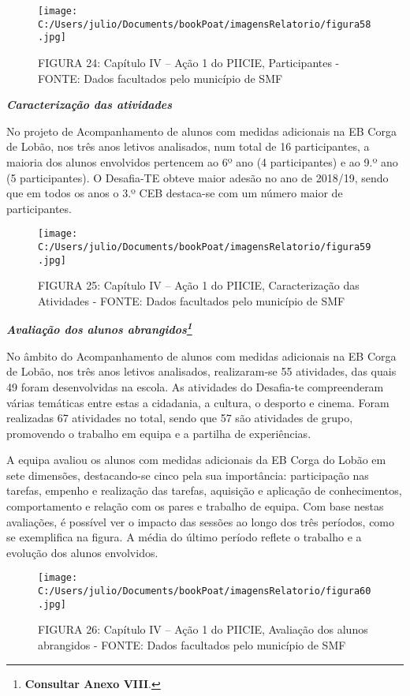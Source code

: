 \documentclass[
]{book}
\begin{document}
\begin{figure}
\centering
\texttt{[image: C:/Users/julio/Documents/bookPoat/imagensRelatorio/figura58.jpg]}
\caption{FIGURA 24: Capítulo IV -- Ação 1 do PIICIE, Participantes - FONTE: Dados facultados pelo município de SMF}
\end{figure}

\textbf{\emph{Caracterização das atividades}}

No projeto de Acompanhamento de alunos com medidas adicionais na EB Corga de Lobão, nos três anos letivos analisados, num total de 16 participantes, a maioria dos alunos envolvidos pertencem ao 6º ano (4 participantes) e ao 9.º ano (5 participantes). O Desafia-TE obteve maior adesão no ano de 2018/19, sendo que em todos os anos o 3.º CEB destaca-se com um número maior de participantes.

\begin{figure}
\centering
\texttt{[image: C:/Users/julio/Documents/bookPoat/imagensRelatorio/figura59.jpg]}
\caption{FIGURA 25: Capítulo IV -- Ação 1 do PIICIE, Caracterização das Atividades - FONTE: Dados facultados pelo município de SMF}
\end{figure}

\textbf{\emph{Avaliação dos alunos abrangidos\footnote{\textbf{Consultar Anexo VIII}.}}}

No âmbito do Acompanhamento de alunos com medidas adicionais na EB Corga de Lobão, nos três anos letivos analisados, realizaram-se 55 atividades, das quais 49 foram desenvolvidas na escola. As atividades do Desafia-te compreenderam várias temáticas entre estas a cidadania, a cultura, o desporto e cinema. Foram realizadas 67 atividades no total, sendo que 57 são atividades de grupo, promovendo o trabalho em equipa e a partilha de experiências.

A equipa avaliou os alunos com medidas adicionais da EB Corga do Lobão em sete dimensões, destacando-se cinco pela sua importância: participação nas tarefas, empenho e realização das tarefas, aquisição e aplicação de conhecimentos, comportamento e relação com os pares e trabalho de equipa. Com base nestas avaliações, é possível ver o impacto das sessões ao longo dos três períodos, como se exemplifica na figura. A média do último período reflete o trabalho e a evolução dos alunos envolvidos.

\begin{figure}
\centering
\texttt{[image: C:/Users/julio/Documents/bookPoat/imagensRelatorio/figura60.jpg]}
\caption{FIGURA 26: Capítulo IV -- Ação 1 do PIICIE, Avaliação dos alunos abrangidos - FONTE: Dados facultados pelo município de SMF}
\end{figure}
\end{document}
